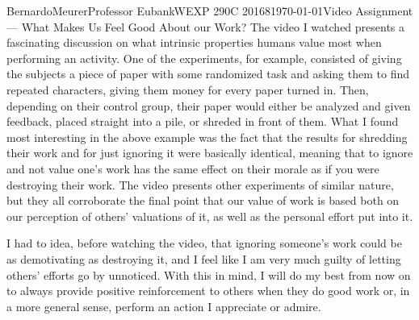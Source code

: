 \documentclass[12pt,letterpaper]{article}
\begin{document}
\begin{mla}{Bernardo}{Meurer}{Professor Eubank}{WEXP 290C 20168}{\today}{Video Assignment --- What Makes Us Feel Good About our Work?}
    The video I watched presents a fascinating discussion on what intrinsic properties humans value most when performing an activity. One of the experiments, for example, consisted of giving the subjects a piece of paper with some randomized task and asking them to find repeated characters, giving them money for every paper turned in. Then, depending on their control group, their paper would either be analyzed and given feedback, placed straight into a pile, or shreded in front of
    them. What I found most interesting in the above example was the fact that the results for shredding their work and for just ignoring it were basically identical, meaning that to ignore and not value one's work has the same effect on their morale as if you were destroying their work. The video presents other experiments of similar nature, but they all corroborate the final point that our value of work is based both on our perception of others' valuations of it, as well as the
    personal effort put into it.

    I had to idea, before watching the video, that ignoring someone's work could be as demotivating as destroying it, and I feel like I am very much guilty of letting others' efforts go by unnoticed. With this in mind, I will do my best from now on to always provide positive reinforcement to others when they do good work or, in a more general sense, perform an action I appreciate or admire.
\end{mla}
\end{document}
